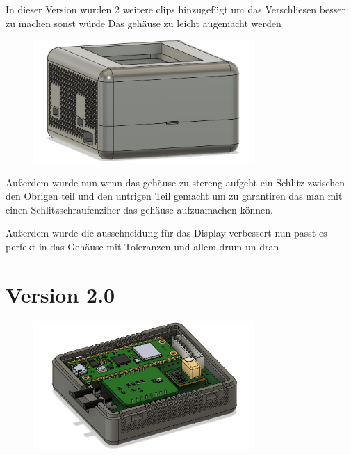 \begin{inhalt}
In dieser Version wurden 2 weitere clips hinzugefügt um das Verschliesen besser zu machen sonst würde Das gehäuse zu leicht augemacht werden

\begin{figure}[!htb]
\centering
\includegraphics[width=0.75\textwidth]{files/Thomas/pics/geheause/1.2/gehaeuse_back.png}
\caption[Bildbezeichnung für Abbildungsverzeichnis]{}
\label{fig:gehaeuse_internet_bild}
\end{figure}

Außerdem wurde nun wenn das gehäuse zu stereng aufgeht ein Schlitz zwischen den Obrigen teil und den untrigen Teil gemacht um zu garantiren das man mit einen Schlitzschraufenziher das gehäuse aufzuamachen können.

Außerdem wurde die ausschneidung für das Display verbessert nun passt es perfekt in das Gehäuse mit Toleranzen und allem drum un dran


\section{Version 2.0}

\begin{figure}[!htb]
\centering
\includegraphics[width=0.75\textwidth]{files/Thomas/pics/geheause/2.0/gehaeuse_side.png}
\caption[Bildbezeichnung für Abbildungsverzeichnis]{}
\label{fig:gehaeuse_internet_bild}
\end{figure}


\end{inhalt}
